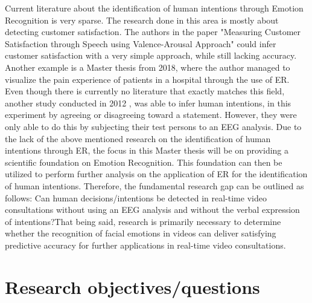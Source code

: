 \documentclass[11pt,a4paper]{scrbook}
\begin{document}
Current literature about the identification of human intentions through Emotion Recognition is very sparse. The research done in this area is mostly about detecting customer satisfaction. The authors in the paper "Measuring Customer Satisfaction through Speech using Valence-Arousal Approach" \cite{Kamaruddin:2016:MeasuringCustomerSatisfaction} could infer customer satisfaction with a very simple approach, while still lacking accuracy. Another example is a Master thesis from 2018, where the author \cite{Esser:2018:LandmarkDetection} managed to visualize the pain experience of patients in a hospital through the use of \gls{ER}. Even though there is currently no literature that exactly matches this field, another study conducted in 2012 \cite{Dong:2012:UnderstandHumanImplicitIntention}, was able to infer human intentions, in this experiment by agreeing or disagreeing toward a statement. However, they were only able to do this by subjecting their test persons to an \gls{EEG} analysis.
\newline\newline
Due to the lack of the above mentioned research on the identification of human intentions through \gls{ER}, the focus in this Master thesis will be on providing a scientific foundation on Emotion Recognition. This foundation can then be utilized to perform further analysis on the application of \gls{ER} for the identification of human intentions.
\newline\newline
Therefore, the fundamental research gap can be outlined as follows: Can human decisions/intentions be detected in real-time video consultations without using an \gls{EEG} analysis and without the verbal expression of intentions?\newline That being said, research is primarily necessary to determine whether the recognition of facial emotions in videos can deliver satisfying predictive accuracy for further applications in real-time video consultations.


\chapter{Research objectives/questions}

\end{document}

